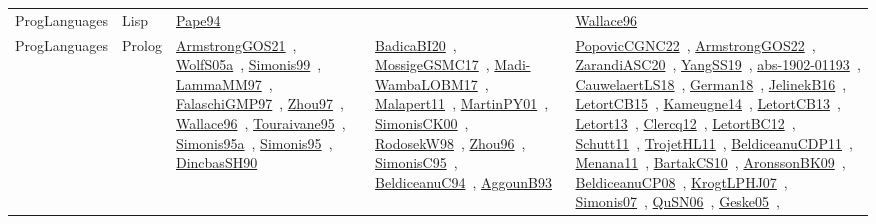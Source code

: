 {\begin{longtable}{lp{3cm}>{\raggedright\arraybackslash}p{6cm}>{\raggedright\arraybackslash}p{6cm}>{\raggedright\arraybackslash}p{8cm}}
ProgLanguages & Lisp & \href{../works/Pape94.pdf}{Pape94}~\cite{Pape94} &  & \href{../works/Wallace96.pdf}{Wallace96}~\cite{Wallace96}\\
ProgLanguages & Prolog & \href{../works/ArmstrongGOS21.pdf}{ArmstrongGOS21}~\cite{ArmstrongGOS21}, \href{../works/WolfS05a.pdf}{WolfS05a}~\cite{WolfS05a}, \href{../works/Simonis99.pdf}{Simonis99}~\cite{Simonis99}, \href{../works/LammaMM97.pdf}{LammaMM97}~\cite{LammaMM97}, \href{../works/FalaschiGMP97.pdf}{FalaschiGMP97}~\cite{FalaschiGMP97}, \href{../works/Zhou97.pdf}{Zhou97}~\cite{Zhou97}, \href{../works/Wallace96.pdf}{Wallace96}~\cite{Wallace96}, \href{../works/Touraivane95.pdf}{Touraivane95}~\cite{Touraivane95}, \href{../works/Simonis95a.pdf}{Simonis95a}~\cite{Simonis95a}, \href{../works/Simonis95.pdf}{Simonis95}~\cite{Simonis95}, \href{../works/DincbasSH90.pdf}{DincbasSH90}~\cite{DincbasSH90} & \href{../works/BadicaBI20.pdf}{BadicaBI20}~\cite{BadicaBI20}, \href{../works/MossigeGSMC17.pdf}{MossigeGSMC17}~\cite{MossigeGSMC17}, \href{../works/Madi-WambaLOBM17.pdf}{Madi-WambaLOBM17}~\cite{Madi-WambaLOBM17}, \href{../works/Malapert11.pdf}{Malapert11}~\cite{Malapert11}, \href{../works/MartinPY01.pdf}{MartinPY01}~\cite{MartinPY01}, \href{../works/SimonisCK00.pdf}{SimonisCK00}~\cite{SimonisCK00}, \href{../works/RodosekW98.pdf}{RodosekW98}~\cite{RodosekW98}, \href{../works/Zhou96.pdf}{Zhou96}~\cite{Zhou96}, \href{../works/SimonisC95.pdf}{SimonisC95}~\cite{SimonisC95}, \href{../works/BeldiceanuC94.pdf}{BeldiceanuC94}~\cite{BeldiceanuC94}, \href{../works/AggounB93.pdf}{AggounB93}~\cite{AggounB93} & \href{../works/PopovicCGNC22.pdf}{PopovicCGNC22}~\cite{PopovicCGNC22}, \href{../works/ArmstrongGOS22.pdf}{ArmstrongGOS22}~\cite{ArmstrongGOS22}, \href{../works/ZarandiASC20.pdf}{ZarandiASC20}~\cite{ZarandiASC20}, \href{../works/YangSS19.pdf}{YangSS19}~\cite{YangSS19}, \href{../works/abs-1902-01193.pdf}{abs-1902-01193}~\cite{abs-1902-01193}, \href{../works/CauwelaertLS18.pdf}{CauwelaertLS18}~\cite{CauwelaertLS18}, \href{../works/German18.pdf}{German18}~\cite{German18}, \href{../works/JelinekB16.pdf}{JelinekB16}~\cite{JelinekB16}, \href{../works/LetortCB15.pdf}{LetortCB15}~\cite{LetortCB15}, \href{../works/Kameugne14.pdf}{Kameugne14}~\cite{Kameugne14}, \href{../works/LetortCB13.pdf}{LetortCB13}~\cite{LetortCB13}, \href{../works/Letort13.pdf}{Letort13}~\cite{Letort13}, \href{../works/Clercq12.pdf}{Clercq12}~\cite{Clercq12}, \href{../works/LetortBC12.pdf}{LetortBC12}~\cite{LetortBC12}, \href{../works/Schutt11.pdf}{Schutt11}~\cite{Schutt11}, \href{../works/TrojetHL11.pdf}{TrojetHL11}~\cite{TrojetHL11}, \href{../works/BeldiceanuCDP11.pdf}{BeldiceanuCDP11}~\cite{BeldiceanuCDP11}, \href{../works/Menana11.pdf}{Menana11}~\cite{Menana11}, \href{../works/BartakCS10.pdf}{BartakCS10}~\cite{BartakCS10}, \href{../works/AronssonBK09.pdf}{AronssonBK09}~\cite{AronssonBK09}, \href{../works/BeldiceanuCP08.pdf}{BeldiceanuCP08}~\cite{BeldiceanuCP08}, \href{../works/KrogtLPHJ07.pdf}{KrogtLPHJ07}~\cite{KrogtLPHJ07}, \href{../works/Simonis07.pdf}{Simonis07}~\cite{Simonis07}, \href{../works/QuSN06.pdf}{QuSN06}~\cite{QuSN06}, \href{../works/Geske05.pdf}{Geske05}~\cite{Geske05}, 
\end{longtable}}
